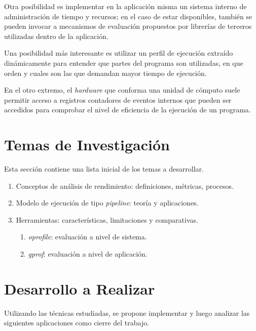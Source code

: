 \documentclass[a4paper]{article}
\begin{document}
\smallskip

Otra posibilidad es implementar en la aplicaci\'on misma un sistema interno de
administraci\'on de tiempo y recursos; en el caso de estar disponibles,
tambi\'en se pueden invocar a mecanismos de evaluaci\'on propuestos por
librer\'ias de terceros utilizadas dentro de la aplicaci\'on.

\smallskip

Una posibilidad m\'as interesante es utilizar un perfil de ejecuci\'on
extra\'ido din\'amicamente para entender que partes del programa son
utilizadas, en que orden y cuales son las que demandan mayor tiempo de
ejecuci\'on.

\smallskip

En el otro extremo, el {\it hardware} que conforma una unidad de c\'omputo
suele permitir acceso a registros contadores de eventos internos que pueden
ser accedidos para comprobar el nivel de eficiencia de la ejecuci\'on de un
programa.

\section{Temas de Investigaci\'on}

Esta secci\'on contiene una lista inicial de los temas a desarrollar.

\begin{enumerate}
\item Conceptos de an\'alisis de rendimiento: definiciones, m\'etricas,
  procesos.
\item Modelo de ejecuci\'on de tipo {\it pipeline}: teor\'ia y aplicaciones.
\item Herramientas: caracter\'isticas, limitaciones y comparativas.
\begin{enumerate}
\item {\it oprofile}: evaluaci\'on a nivel de sistema.
\item {\it gprof}: evaluaci\'on a nivel de aplicaci\'on.
\end{enumerate}
\end{enumerate}

\section{Desarrollo a Realizar}

Utilizando las t\'ecnicas estudiadas, se propone implementar y luego analizar
las siguientes aplicaciones como cierre del trabajo.
\end{document}
